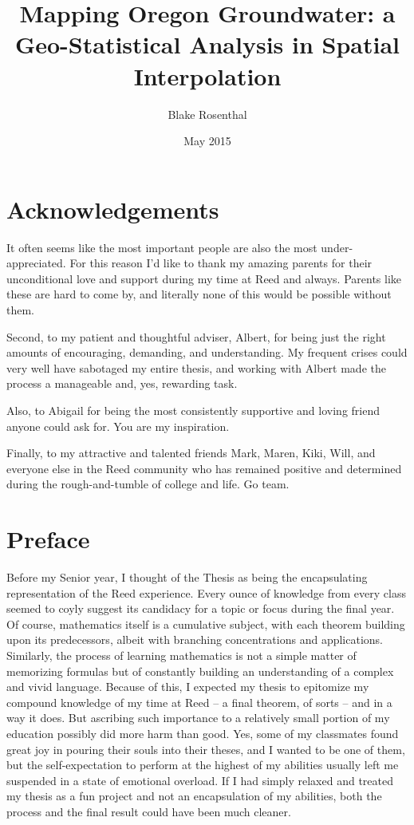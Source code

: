 \documentclass[12pt,twoside]{reedthesis}
\title{Mapping Oregon Groundwater: a Geo-Statistical Analysis in Spatial Interpolation}
\author{Blake Rosenthal}
\date{May 2015}
\begin{document}
  \maketitle
  \frontmatter %
  \pagestyle{empty} %
  
  \onehalfspacing


    \chapter*{Acknowledgements}
	It often seems like the most important people are also the most under-appreciated. For this reason I'd like to thank my amazing parents for their unconditional love and support during my time at Reed and always. Parents like these are hard to come by, and literally none of this would be possible without them.
	
	Second, to my patient and thoughtful adviser, Albert, for being just the right amounts of encouraging, demanding, and understanding. My frequent crises could very well have sabotaged my entire thesis, and working with Albert made the process a manageable and, yes, rewarding task. 
	
	Also, to Abigail for being the most consistently supportive and loving friend anyone could ask for. You are my inspiration. 
	
	Finally, to my attractive and talented friends Mark, Maren, Kiki, Will, and everyone else in the Reed community who has remained positive and determined during the rough-and-tumble of college and life. Go team.


    \chapter*{Preface}
    
	Before my Senior year, I thought of the Thesis as being the encapsulating representation of the Reed experience. Every ounce of knowledge from every class seemed to coyly suggest its candidacy for a topic or focus during the final year. Of course, mathematics itself is a cumulative subject, with each theorem building upon its predecessors, albeit with branching concentrations and applications. Similarly, the process of learning mathematics is not a simple matter of memorizing formulas but of constantly building an understanding of a complex and vivid language. Because of this, I expected my thesis to epitomize my compound knowledge of my time at Reed -- a final theorem, of sorts -- and in a way it does. But ascribing such importance to a relatively small portion of my education possibly did more harm than good. Yes, some of my classmates found great joy in pouring their souls into their theses, and I wanted to be one of them, but the self-expectation to perform at the highest of my abilities usually left me suspended in a state of emotional overload. If I had simply relaxed and treated my thesis as a fun project and not an encapsulation of my abilities, both the process and the final result could have been much cleaner. 
	
\end{document}
